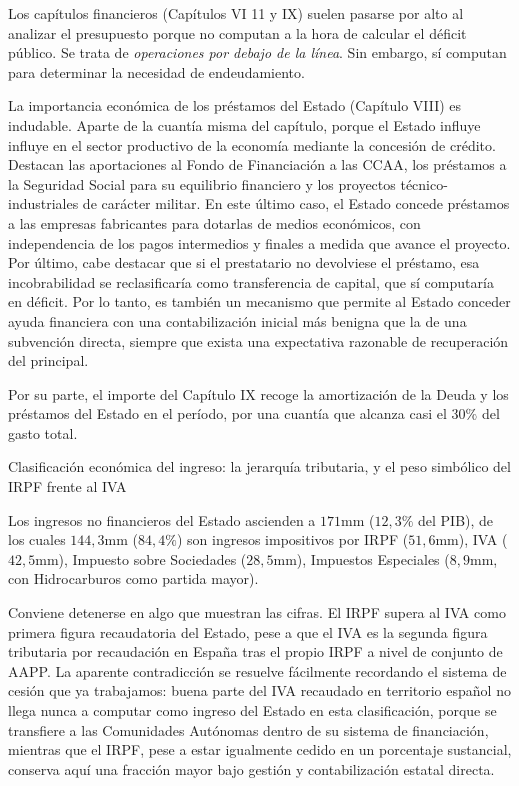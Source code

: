 \documentclass[10pt,a4paper]{article}
\begin{document}
Los capítulos financieros (Capítulos VI 11 y IX) suelen pasarse por alto al analizar el presupuesto porque no computan a la hora de calcular el déficit público. Se trata de \textit{operaciones por debajo de la línea}. Sin embargo, sí computan para determinar la necesidad de endeudamiento.

La importancia económica de los préstamos del Estado (Capítulo VIII) es indudable. Aparte de la cuantía misma del capítulo, porque el Estado influye influye en el sector productivo de la economía mediante la concesión de crédito. Destacan las aportaciones al Fondo de Financiación a las CCAA, los préstamos a la Seguridad Social para su equilibrio financiero y los proyectos técnico-industriales de carácter militar. En este último caso, el Estado concede préstamos a las empresas fabricantes para dotarlas de medios económicos, con independencia de los pagos intermedios y finales a medida que avance el proyecto. Por último, cabe destacar que si el prestatario no devolviese el préstamo, esa incobrabilidad se reclasificaría como transferencia de capital, que sí computaría en déficit. Por lo tanto, es también un mecanismo que permite al Estado conceder ayuda financiera con una contabilización inicial más benigna que la de una subvención directa, siempre que exista una expectativa razonable de recuperación del principal. 

Por su parte, el importe del Capítulo IX recoge la amortización de la Deuda y los préstamos del Estado en el período, por una cuantía que alcanza casi el $30\%$ del gasto total.

Clasificación económica del ingreso: la jerarquía tributaria, y el peso simbólico del IRPF frente al IVA

Los ingresos no financieros del Estado ascienden a $171$mm ($12,3\%$ del PIB), de los cuales $144,3$mm ($84,4\%$) son ingresos impositivos por IRPF ($51,6$mm), IVA ($42,5$mm), Impuesto sobre Sociedades ($28,5$mm), Impuestos Especiales ($8,9$mm, con Hidrocarburos como partida mayor).

Conviene detenerse en algo que muestran las cifras. El IRPF supera al IVA como primera figura recaudatoria del Estado, pese a que el IVA es la segunda figura tributaria por recaudación en España tras el propio IRPF a nivel de conjunto de AAPP. La aparente contradicción se resuelve fácilmente recordando el sistema de cesión que ya trabajamos: buena parte del IVA recaudado en territorio español no llega nunca a computar como ingreso del Estado en esta clasificación, porque se transfiere a las Comunidades Autónomas dentro de su sistema de financiación, mientras que el IRPF, pese a estar igualmente cedido en un porcentaje sustancial, conserva aquí una fracción mayor bajo gestión y contabilización estatal directa. 
\end{document}
